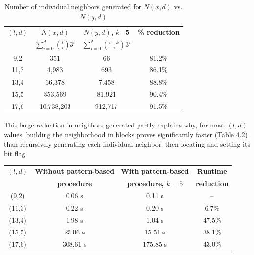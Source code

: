 \documentclass[oneside,12pt]{DISCSthesis}
\begin{document}
{		\begin{table}[h] %
			\small
			\renewcommand{\arraystretch}{1.3}
			\label{tbl:neighbors_blockmasking}
			\centering
			\begin{tabular}{|c|c|c|c|}
			\hline 
			\bfseries\boldmath $(l,d)$ & \bfseries\boldmath $N(x,d)$ & \bfseries\boldmath $N(y,d)$, $k$=5 & \bfseries \% reduction\\
			\bfseries & \bfseries\boldmath $\sum_{i=0}^{d} \binom{l}{i} 3^{i}$ & \bfseries\boldmath $\sum_{i=0}^{d} \binom{l-k}{i} 3^{i}$ & \\
			\hline
			 9,2 &         351  &       66 & 81.2\%\\
			11,3 &       4,983  &      693 & 86.1\%\\
			13,4 &      66,378  &    7,458 & 88.8\%\\
			15,5 &     853,569  &   81,921 & 90.4\%\\
			17,6 &  10,738,203  &  912,717 & 91.5\%\\
			\hline\end{tabular}

			\caption{\small Number of individual neighbors generated for $N(x,d)$ vs. $N(y,d)$}
			\end{table}

		\noindent This large reduction in neighbors generated partly explains why, for most $(l,d)$ values, building the neighborhood in blocks proves significantly faster (Table 4.\ref{tbl:speedup_blockmasking}) than recursively generating each individual neighbor, then locating and setting its bit flag. \newline 

		\begin{table}[h] %
			\small
			\renewcommand{\arraystretch}{1.3}
			\label{tbl:speedup_blockmasking}
			\centering
			\begin{tabular}{|c|c|c|c|}
			\hline 
			\bfseries\boldmath $(l,d)$ & \bfseries Without pattern-based & \bfseries With pattern-based & \bfseries Runtime\\
			\bfseries & \bfseries procedure & \bfseries\boldmath procedure, $k=5$ & \bfseries reduction\\
			\hline
			 (9,2) &   0.06 s &    0.11 s &     --  \\
			(11,3) &   0.22 s &    0.20 s &    6.7\%\\
			(13,4) &   1.98 s &    1.04 s &   47.5\%\\
			(15,5) &  25.06 s &   15.51 s &   38.1\%\\
			(17,6) & 308.61 s &  175.85 s &   43.0\%\\
			\hline\end{tabular}


\end{table}}
\end{document}
